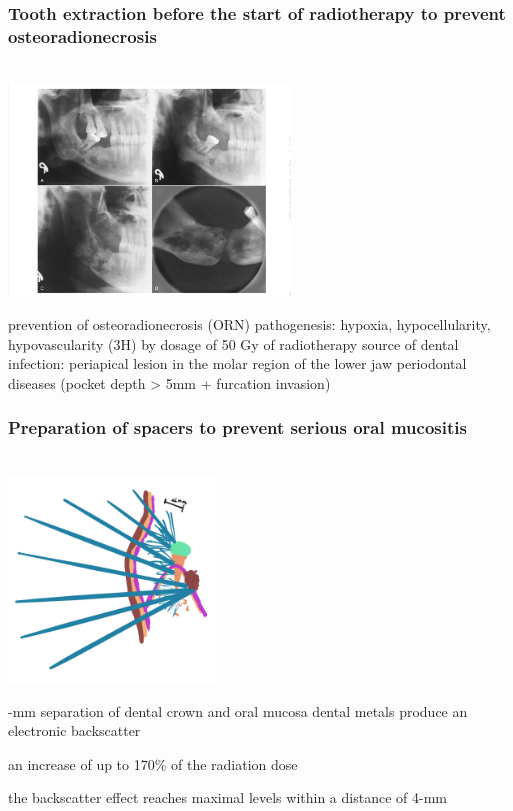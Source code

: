 \documentclass[
paper=landscape,
paper=160mm:90mm, %
fontsize=11pt, %
pagesize, %
parskip=half-, %
]{scrartcl} %
\newenvironment{WrapText1}[3][r]
{\wrapfigure[#2]{#1}{#3}}
{\endwrapfigure}
\newcommand{\wrapr}[6]{
\begin{minipage}{\linewidth}\mbox{}\\
\vspace{#1}
\begin{WrapText1}{#2}{#3}
\vspace{#4}#5\end{WrapText1}#6
\end{minipage}}
\theoremstyle{mythmstyle} %
\begin{document}
\subsubsection{Tooth extraction before the start of radiotherapy to prevent osteoradionecrosis}
\wrapr{-1mm}{7}{9cm}{-15mm}
{%
\includegraphics[width=7.5cm]{mandible_ORN.jpg}
} %
{%
\begin{outline}
\0 prevention of osteoradionecrosis (ORN)
\1 pathogenesis: hypoxia, hypocellularity, hypovascularity (3H) by dosage of 50 Gy of radiotherapy
\1 source of dental infection: 
    \2 periapical lesion in the molar region of the lower jaw
    \2 periodontal diseases (pocket depth > 5mm + furcation invasion)
\end{outline}
} %
\clearpage

\subsubsection{Preparation of spacers to prevent serious oral mucositis}
\wrapr{-1mm}{7}{9cm}{-10mm}
{%
\includegraphics[width=5.5cm]{backscatter.jpg}
} %
{%
\begin{outline}
\0 5-mm separation of dental crown and oral mucosa
\1 dental metals produce an electronic backscatter

\1 an increase of up to 170\% of the radiation dose

\1 the backscatter effect reaches maximal levels within a distance of 4-mm
\end{outline}
} %
\clearpage
\end{document}
